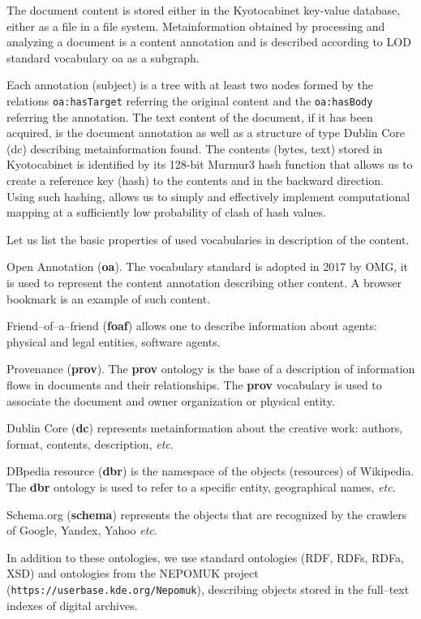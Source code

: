 \documentclass[conference,a4paper]{IEEEtran}
\providecommand\url[1]{\texttt{#1}}
\begin{document}
The document content is stored either in the Kyotocabinet key-value database, either as a file in a file system.  Metainformation obtained by processing and analyzing a document is a content annotation and is described according to LOD standard vocabulary oa as a subgraph.

Each annotation (subject) is a tree with at least two nodes formed by the relations \texttt{oa:hasTarget} referring the original content and the \texttt{oa:hasBody} referring the annotation.  The text content of the document, if it has been acquired, is the document annotation as well as a structure of type Dublin Core (dc) describing metainformation found.  The contents (bytes, text) stored in Kyotocabinet is identified by its 128-bit Murmur3 hash function that allows us to create a reference key (hash) to the contents and in the backward direction.  Using such hashing, allows us to simply and effectively implement computational mapping at a sufficiently low probability of clash of hash values.

Let us list the basic properties of used vocabularies in description of the content.

Open Annotation (\textbf{oa}). The vocabulary standard is adopted in 2017 by OMG, it is used to represent the content annotation describing other content.  A browser bookmark is an example of such content.

Friend--of--a--friend (\textbf{foaf}) allows one to describe information about agents: physical and legal entities, software agents.

Provenance (\textbf{prov}).  The \textbf{prov} ontology is the base of a description of information flows in documents and their relationships. The \textbf{prov} vocabulary is used to associate the document and owner organization or physical entity.

Dublin Core (\textbf{dc}) represents metainformation about the creative work: authors, format, contents, description, \emph{etc}.

DBpedia resource (\textbf{dbr}) is the namespace of the objects (resources) of Wikipedia.  The \textbf{dbr} ontology is used to refer to a specific entity, geographical names, \emph{etc}.

Schema.org (\textbf{schema}) represents the objects that are recognized by the crawlers of Google, Yandex, Yahoo \emph{etc}.

In addition to these ontologies, we use standard ontologies (RDF, RDFs, RDFa, XSD) and ontologies from the NEPOMUK project (\url{https://userbase.kde.org/Nepomuk}), describing objects stored in the full--text indexes of digital archives.
\end{document}
